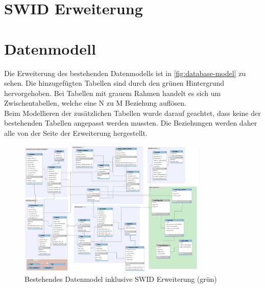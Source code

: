 \section{SWID Erweiterung}
\label{swiderweiterung}

\section{Datenmodell}
Die Erweiterung des bestehenden Datenmodells ist in \autoref{fig:database-model}
zu sehen. Die hinzugefügten Tabellen sind durch den grünen Hintergrund
hervorgehoben. Bei Tabellen mit grauem Rahmen handelt es sich um
Zwischentabellen, welche eine N zu M Beziehung auflösen.\\
Beim Modellieren der zusätzlichen Tabellen wurde darauf geachtet, dass keine der
bestehenden Tabellen angepasst werden mussten. Die Beziehungen werden daher alle
von der Seite der Erweiterung hergestellt.

\begin{figure}[H]
	\centering
	\includegraphics[angle=90,width=0.8\textwidth]{./images/db/database-model}
	\caption{Bestehendes Datenmodel inklusive SWID Erweiterung (grün)}
	\label{fig:database-model}
\end{figure}


